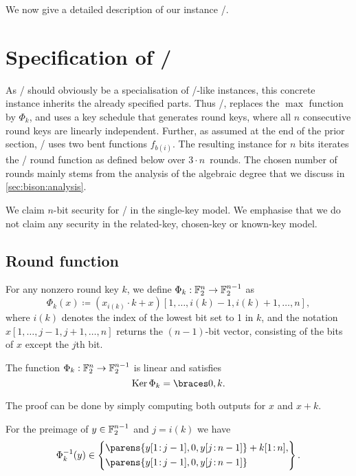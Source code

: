 We now give a detailed description of our instance \bison/.

\section{Specification of \bison/}\label{sec:bison:instance}
As \bison/ should obviously be a specialisation of \bison/-like instances, this concrete instance inherits the already specified parts.
Thus \bison/, replaces the $\max$ function by $\Phi_k$, and uses a key schedule that generates round keys, where all $n$ consecutive round keys are linearly independent.
Further, as assumed at the end of the prior section, \bison/ uses two bent functions $f_{b(i)}$.
The resulting instance for $n$ bits iterates the \WSN/ round function as defined below over $3 \cdot n$~rounds.
The chosen number of rounds mainly stems from the analysis of the algebraic degree that we discuss in \cref{sec:bison:analysis}.

\begin{secclaim}[\bison/]
  We claim $n$-bit security for \bison/ in the single-key model.
  We emphasise that we do not claim any security in the related-key, chosen-key or known-key model.
\end{secclaim}

\subsection{Round function}
For any nonzero round key $k$, we define $\Phi_{k} : \mathbb{F}_2^{n} \to \mathbb{F}_2^{n-1}$ as
\begin{equation}\label{bison:eqn:phi}
    \Phi_{k}(x) \coloneqq (x_{i(k)} \cdot k + x)[1,\ldots,i(k)-1,i(k)+1,\ldots,n],
\end{equation}
where $i(k)$ denotes the index of the lowest bit set to 1 in $k$, and the notation $x[1,\ldots,j-1,j+1,\ldots,n]$ returns the $(n-1)$-bit vector, consisting of the bits of $x$ except the $j$th bit.

\begin{lemma}\label{bison:lem:phi_prop}
    The function $\Phi_k : \mathbb{F}_2^{n} \to \mathbb{F}_2^{n-1}$ is linear and satisfies
    \begin{equation*}
        \Ker \Phi_{k} = \set{0,k}.
    \end{equation*}
\end{lemma}
The proof can be done by simply computing both outputs for $x$ and $x+k$.

For the preimage of $y \in \mathbb{F}_2^{n-1}$ and $j = i(k)$ we have
\begin{equation}\label{bison:eqn:phi_preimage}
    \Phi_k^{-1}(y) \in \left\{
        \begin{aligned}
            &\parens{y[1\colon\!j-1], 0, y[j\colon\!n-1]} + k[1\colon\!n], \\
            &\parens{y[1\colon\!j-1], 0, y[j\colon\!n-1]}
        \end{aligned}
    \right\}.
\end{equation}

